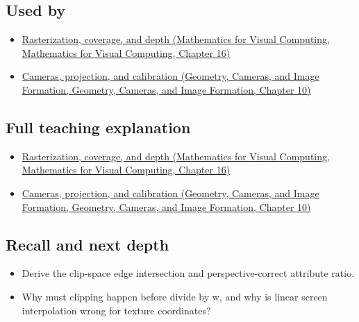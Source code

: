 \subsection{Used by}\label{appendix-40426e4b2103-used-by}

\begin{itemize}
\tightlist
\item
  \href{../02-Mathematics-for-Visual-Computing/main.pdf\#nameddest=03-visual-computing-i-ch012-rasterization-coverage-and-depth}{Rasterization, coverage, and depth (Mathematics for Visual Computing, Mathematics for Visual Computing, Chapter 16)}
\item
  \href{../03-Geometry-Cameras-and-Image-Formation/main.pdf\#nameddest=03-visual-computing-i-ch003-cameras-projection-and-calibration}{Cameras, projection, and calibration (Geometry, Cameras, and Image Formation, Geometry, Cameras, and Image Formation, Chapter 10)}
\end{itemize}

\subsection{Full teaching explanation}\label{appendix-40426e4b2103-full-teaching-explanation}

\begin{itemize}
\tightlist
\item
  \href{../02-Mathematics-for-Visual-Computing/main.pdf\#nameddest=03-visual-computing-i-ch012-rasterization-coverage-and-depth}{Rasterization, coverage, and depth (Mathematics for Visual Computing, Mathematics for Visual Computing, Chapter 16)}
\item
  \href{../03-Geometry-Cameras-and-Image-Formation/main.pdf\#nameddest=03-visual-computing-i-ch003-cameras-projection-and-calibration}{Cameras, projection, and calibration (Geometry, Cameras, and Image Formation, Geometry, Cameras, and Image Formation, Chapter 10)}
\end{itemize}

\subsection{Recall and next depth}\label{appendix-40426e4b2103-recall-and-next-depth}

\begin{itemize}
\tightlist
\item
  Derive the clip-space edge intersection and perspective-correct attribute ratio.
\item
  Why must clipping happen before divide by w, and why is linear screen interpolation wrong for texture coordinates?
\end{itemize}

